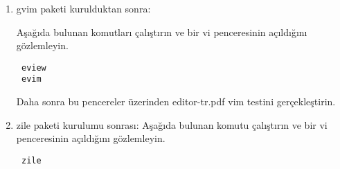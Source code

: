 \documentclass[a4paper,10pt]{article}
\begin{document}
\begin{enumerate}
\item gvim paketi kurulduktan sonra:

Aşağıda bulunan komutları çalıştırın ve bir vi penceresinin açıldığını gözlemleyin.
\begin{verbatim}
 eview
 evim
\end{verbatim}

Daha sonra bu pencereler üzerinden editor-tr.pdf vim testini gerçekleştirin.

\item zile paketi kurulumu sonrası:
Aşağıda bulunan komutu çalıştırın ve bir vi penceresinin açıldığını gözlemleyin.
\begin{verbatim}
 zile
\end{verbatim}


\end{enumerate}
\end{document}
